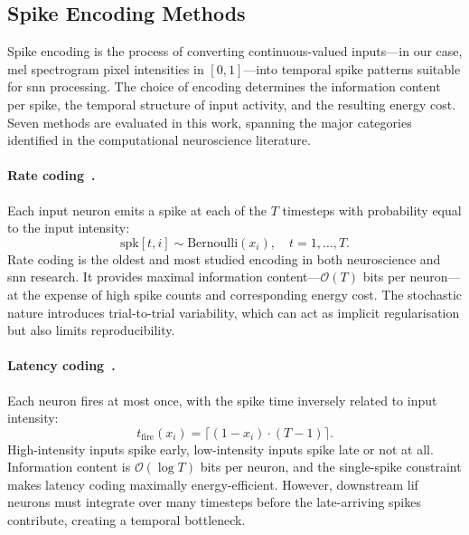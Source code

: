 \subsection{Spike Encoding Methods}
\label{subsec:encoding}

Spike encoding is the process of converting continuous-valued inputs---in our case, mel spectrogram pixel intensities in $[0, 1]$---into temporal spike patterns suitable for \gls{snn} processing. The choice of encoding determines the information content per spike, the temporal structure of input activity, and the resulting energy cost. Seven methods are evaluated in this work, spanning the major categories identified in the computational neuroscience literature.

\paragraph{Rate coding~\citep{adrian1926}.}
Each input neuron emits a spike at each of the $T$ timesteps with probability equal to the input intensity:
\begin{equation}
    \mathrm{spk}[t, i] \sim \mathrm{Bernoulli}(x_i), \quad t = 1, \ldots, T.
    \label{eq:rate-coding}
\end{equation}
Rate coding is the oldest and most studied encoding in both neuroscience and \gls{snn} research. It provides maximal information content---$\mathcal{O}(T)$ bits per neuron---at the expense of high spike counts and corresponding energy cost. The stochastic nature introduces trial-to-trial variability, which can act as implicit regularisation but also limits reproducibility.

\paragraph{Latency coding~\citep{thorpe1996}.}
Each neuron fires at most once, with the spike time inversely related to input intensity:
\begin{equation}
    t_{\mathrm{fire}}(x_i) = \bigl\lceil (1 - x_i) \cdot (T - 1) \bigr\rceil.
    \label{eq:latency-coding}
\end{equation}
High-intensity inputs spike early, low-intensity inputs spike late or not at all. Information content is $\mathcal{O}(\log T)$ bits per neuron, and the single-spike constraint makes latency coding maximally energy-efficient. However, downstream \gls{lif} neurons must integrate over many timesteps before the late-arriving spikes contribute, creating a temporal bottleneck.

